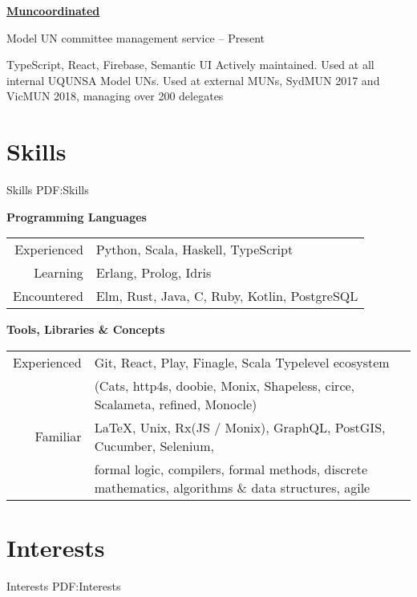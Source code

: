 \documentclass[a4paper,10pt,oneside]{article}
\begin{document}
\begin{body}
\EntryGap

\href{https://github.com/MaxwellBo/Muncoordinated-2}{\textbf{Muncoordinated}}
\par Model UN committee management service\hfill {} -- Present
\begin{detail}
	\BulletItem TypeScript, React, Firebase, Semantic UI
	\BulletItem Actively maintained. Used at all internal UQUNSA Model UNs. Used at external MUNs, SydMUN 2017 and VicMUN 2018, managing over 200 delegates
\end{detail}


\section
{Skills}
{Skills}
{PDF:Skills}

\textbf{Programming Languages}
\par
\begin{tabular}{rl}
\par Experienced & Python, Scala, Haskell, TypeScript\\
\par Learning & Erlang, Prolog, Idris\\
\par Encountered & Elm, Rust, Java, C, Ruby, Kotlin, PostgreSQL
\end{tabular}

\EntryGap
\EntryGap
\EntryGap

\textbf{Tools, Libraries \& Concepts}

\par
\begin{tabular}{rl}
\par Experienced & Git, React, Play, Finagle, Scala Typelevel ecosystem\\
						 & (Cats, http4s, doobie, Monix, Shapeless, circe, Scalameta, refined, Monocle)\\
\par Familiar & \LaTeX, Unix, Rx(JS / Monix), GraphQL, PostGIS, Cucumber, Selenium,\\
& formal logic, compilers, formal methods, discrete mathematics, algorithms \& data structures, agile\\ 
\end{tabular}

\section
{Interests}
{Interests}
{PDF:Interests}


\end{body}
\end{document}
